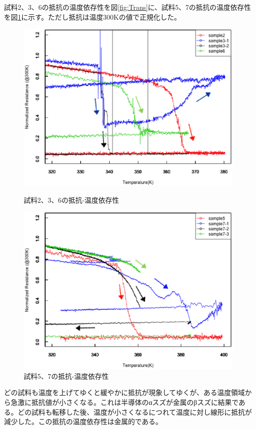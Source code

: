 試料2、3、6の抵抗の温度依存性を図\ref{fig:Trans}に、試料5、7の抵抗の温度依存性を図\ref{fig:Trans2}に示す。ただし抵抗は温度300Kの値で正規化した。
\begin{figure}[!h]
 \begin{minipage}{\hsize}
    \begin{center}
   \includegraphics[width=0.8\hsize]{samples/Trans.eps}
  \end{center}
  \caption{試料2、3、6の抵抗-温度依存性}
  \label{fig:Trans}
 \end{minipage}
 \begin{minipage}{\hsize}
     \begin{center}
   \includegraphics[width=0.8\hsize]{samples/Trans2.eps}
  \end{center}
  \caption{試料5、7の抵抗-温度依存性}
  \label{fig:Trans2}
   \end{minipage}
\end{figure}

どの試料も温度を上げてゆくと緩やかに抵抗が現象してゆくが、ある温度領域から急激に抵抗値が小さくなる。これは半導体のαスズが金属のβスズに結果である。どの試料も転移した後、温度が小さくなるにつれて温度に対し線形に抵抗が減少した。この抵抗の温度依存性は金属的である。

